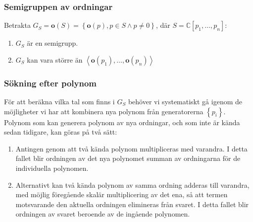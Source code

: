 \documentclass{beamer}
\begin{document}
\begin{frame}
	\frametitle{Semigruppen av ordningar}
	Betrakta $G_S = \mathbf{o}(S) = \left\{\mathbf{o}(p), p \in S \wedge p \neq 0 \right\}$, där $S=\mathbb{C}[p_1,\ldots,p_n]$:
	
	\begin{enumerate}
		\item<2-> $G_S$ är en semigrupp.
		\item<3-> $G_S$ kan vara större än $\left<\mathbf{o}(p_1),\ldots,\mathbf{o}(p_n)\right>$
	\end{enumerate}
		
\end{frame}

\begin{frame}
	\frametitle{Sökning efter polynom}
För att beräkna vilka tal som finns i $G_S$ behöver vi systematiskt gå igenom de möjligheter vi har att kombinera nya polynom från generatorerna $\left\{p_i\right\}$. Polynom som kan generera polynom av nya ordningar, och som inte är kända sedan tidigare, kan göras på två sätt:

\begin{enumerate}
	\item<2-> Antingen genom att två kända polynom multipliceras med varandra. I detta fallet blir ordningen av det nya polynomet summan av ordningarna för de individuella polynomen.
	
	\item<3-> Alternativt kan två kända polynom av samma ordning adderas till varandra, med möjlig föregående skalär multiplicering av det ena, så att termen motsvarande den aktuella ordningen elimineras från svaret. I detta fallet blir ordningen av svaret beroende av de ingående polynomen.
\end{enumerate}
\end{frame}
\end{document}
